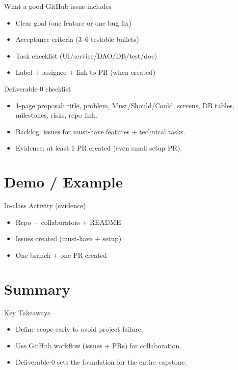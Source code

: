 \documentclass{beamer}
\begin{document}
\begin{frame}{What a good GitHub issue includes}
  \begin{itemize}[<+->]
    \item Clear goal (one feature or one bug fix)
    \item Acceptance criteria (3--6 testable bullets)
    \item Task checklist (UI/service/DAO/DB/test/doc)
    \item Label + assignee + link to PR (when created)
  \end{itemize}
  \slidesources{\OOPSUnitVISources}
\end{frame}

\begin{frame}{Deliverable-0 checklist}
  \begin{itemize}[<+->]
    \item 1-page proposal: title, problem, Must/Should/Could, screens, DB tables, milestones, risks, repo link.
    \item Backlog: issues for must-have features + technical tasks.
    \item Evidence: at least 1 PR created (even small setup PR).
  \end{itemize}
  \slidesources{\OOPSUnitVISources}
\end{frame}


\section{Demo / Example}
\label{sec:demo}

\begin{frame}{In-class Activity (evidence)}
  \begin{itemize}[<+->]
    \item Repo + collaborators + README
    \item Issues created (must-have + setup)
    \item One branch + one PR created
  \end{itemize}
  \slidesources{\OOPSUnitVISources}
\end{frame}


\section{Summary}
\label{sec:summary}

\begin{frame}{Key Takeaways}
  \begin{itemize}[<+->]
    \item Define scope early to avoid project failure.
    \item Use GitHub workflow (issues + PRs) for collaboration.
    \item Deliverable-0 sets the foundation for the entire capstone.
  \end{itemize}
  \slidesources{\OOPSUnitVISources}
\end{frame}
\end{document}
